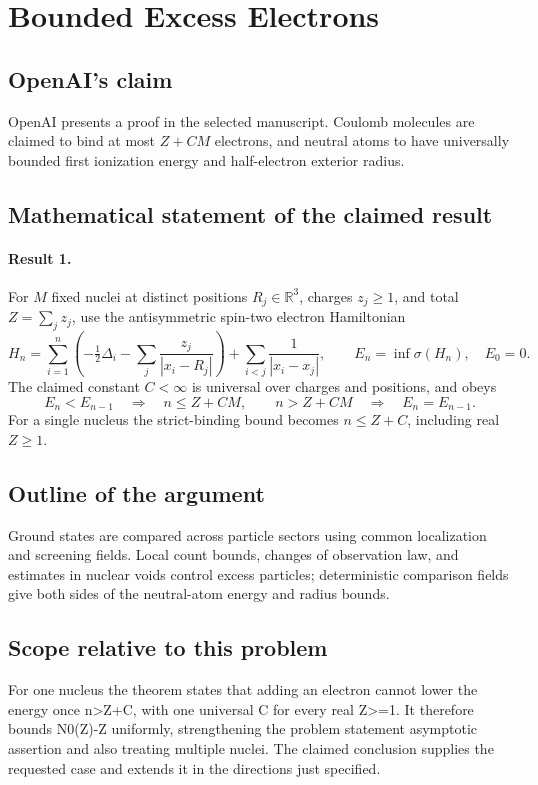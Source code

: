 \documentclass[11pt]{article}
\begin{document}
\section*{Bounded Excess Electrons}

\subsection{OpenAI's claim}
OpenAI presents a proof in the selected manuscript. Coulomb molecules are claimed to bind at most $Z+CM$ electrons, and neutral atoms to have universally bounded first ionization energy and half-electron exterior radius.

\subsection{Mathematical statement of the claimed result}
\paragraph{Result 1.} For \(M\) fixed nuclei at distinct positions \(R_j\in\mathbb R^3\), charges \(z_j\ge1\), and total \(Z=\sum_jz_j\), use the antisymmetric spin-two electron Hamiltonian
\[
 H_n=\sum_{i=1}^n\left(-\tfrac12\Delta_i-\sum_j\frac{z_j}{|x_i-R_j|}\right)
 +\sum_{i<j}\frac1{|x_i-x_j|},\qquad E_n=\inf\sigma(H_n),\quad E_0=0.
\]
The claimed constant \(C<\infty\) is universal over charges and positions, and obeys
\[
 E_n<E_{n-1}\quad\Longrightarrow\quad n\le Z+CM,
 \qquad n>Z+CM\quad\Longrightarrow\quad E_n=E_{n-1}.
\]
For a single nucleus the strict-binding bound becomes \(n\le Z+C\), including real \(Z\ge1\).

\subsection{Outline of the argument}
Ground states are compared across particle sectors using common localization and screening fields. Local count bounds, changes of observation law, and estimates in nuclear voids control excess particles; deterministic comparison fields give both sides of the neutral-atom energy and radius bounds.

\subsection{Scope relative to this problem}
For one nucleus the theorem states that adding an electron cannot lower the energy once n>Z+C, with one universal C for every real Z>=1. It therefore bounds N0(Z)-Z uniformly, strengthening the problem statement asymptotic assertion and also treating multiple nuclei. The claimed conclusion supplies the requested case and extends it in the directions just specified.
\end{document}
